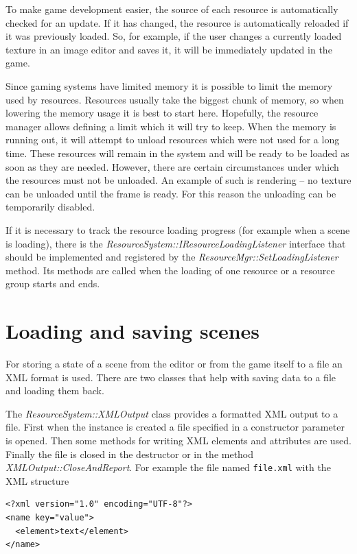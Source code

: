 \documentclass[a4paper, 12pt]{report}
\begin{document}
To make game development easier, the source of each resource is automatically checked for an update. If it has changed, the resource is automatically reloaded if it was previously loaded. So, for example, if the user changes a currently loaded texture in an image editor and saves it, it will be immediately updated in the game.

Since gaming systems have limited memory it is possible to limit the memory used by resources. Resources usually take the biggest chunk of memory, so when lowering the memory usage it is best to start here. Hopefully, the resource manager allows defining a limit which it will try to keep. When the memory is running out, it will attempt to unload resources which were not used for a long time. These resources will remain in the system and will be ready to be loaded as soon as they are needed. However, there are certain circumstances under which the resources must not be unloaded. An example of such is rendering -- no texture can be unloaded until the frame is ready. For this reason the unloading can be temporarily disabled.

If it is necessary to track the resource loading progress (for example when a scene is loading), there is the \emph{ResourceSystem::IResourceLoadingListener} interface that should be implemented and registered by the \emph{ResourceMgr\-::\-Set\-Loading\-Listener} method. Its methods are called when the loading of one resource or a resource group starts and ends.

\section{Loading and saving scenes}

For storing a state of a scene from the editor or from the game itself to a file an XML format is used. There are two classes that help with saving data to a file and loading them back.

The \emph{ResourceSystem::XMLOutput} class provides a formatted XML output to a file. First when the instance is created a file specified in a constructor parameter is opened. Then some methods for writing XML elements and attributes are used. Finally the file is closed in the destructor or in the method \emph{XMLOutput::CloseAndReport}. For example the file named \verb/file.xml/ with the XML structure

\begin{verbatim}
<?xml version="1.0" encoding="UTF-8"?>
<name key="value">
  <element>text</element>
</name>
\end{verbatim}
\end{document}
